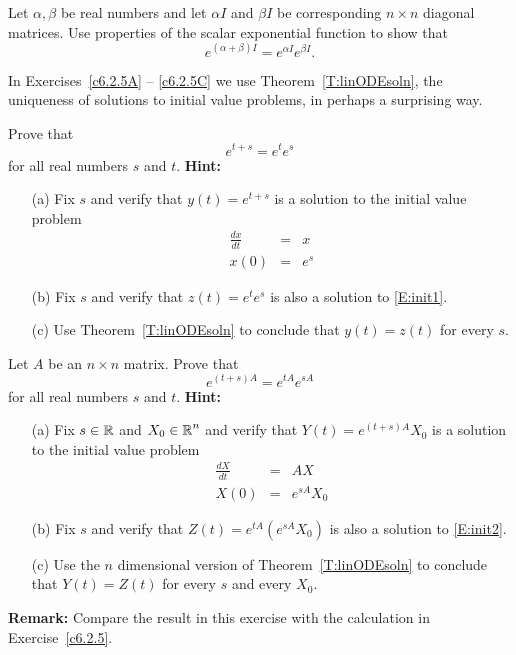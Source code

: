 \documentclass{ximera}
\begin{document}
\begin{exercise} \label{c6.2.5}
Let $\alpha,\beta$ be real numbers and let $\alpha I$ and $\beta
I$ be corresponding $n\times n$ diagonal matrices.  Use
properties of the scalar exponential function to show that
\[
     e^{(\alpha + \beta)I} = e^{\alpha I}e^{\beta I}.
\]
\end{exercise}

\noindent In Exercises~\ref{c6.2.5A} -- \ref{c6.2.5C} we use
Theorem~\ref{T:linODEsoln}, the uniqueness of solutions to initial value
problems, in perhaps a surprising way.
\begin{exercise}  \label{c6.2.5A}
Prove that
\[
e^{t+s} = e^te^s
\]
for all real numbers $s$ and $t$.  {\bf Hint:}
\begin{itemize}
\item[(a)]  Fix $s$ and verify that $y(t) = e^{t+s}$ is a solution to the
initial value problem
\begin{equation}  \label{E:init1}
\begin{array}{rcl}
\frac{dx}{dt} & = & x \\
x(0) & = & e^s
\end{array}
\end{equation}
\item[(b)] Fix $s$ and verify that $z(t) = e^te^s$ is also a solution to
\eqref{E:init1}.
\item[(c)]  Use Theorem~\ref{T:linODEsoln} to conclude that $y(t)=z(t)$ for
every $s$.
\end{itemize}
\end{exercise}
\begin{exercise}  \label{c6.2.5B}
Let $A$ be an $n\times n$ matrix.  Prove that
\[
e^{(t+s)A} = e^{tA}e^{sA}
\]
for all real numbers $s$ and $t$.  {\bf Hint:}
\begin{itemize}
\item[(a)]  Fix $s\in\mbox{$\Bbb{R}$}$ and $X_0\in\mbox{$\Bbb{R}$}^n$ and verify that
$Y(t) = e^{(t+s)A}X_0$ is a solution to the initial value problem
\begin{equation}  \label{E:init2}
\begin{array}{rcl}
\frac{dX}{dt} & = & AX \\
X(0) & = & e^{sA}X_0
\end{array}
\end{equation}
\item[(b)] Fix $s$ and verify that $Z(t) = e^{tA}\left(e^{sA}X_0\right)$ is
also a solution to \eqref{E:init2}.
\item[(c)]  Use the $n$ dimensional version of Theorem~\ref{T:linODEsoln} to
conclude that $Y(t)=Z(t)$ for every $s$ and every $X_0$.
\end{itemize}
{\bf Remark:}  Compare the result in this exercise with the calculation in
Exercise~\ref{c6.2.5}.
\end{exercise}
\end{document}
